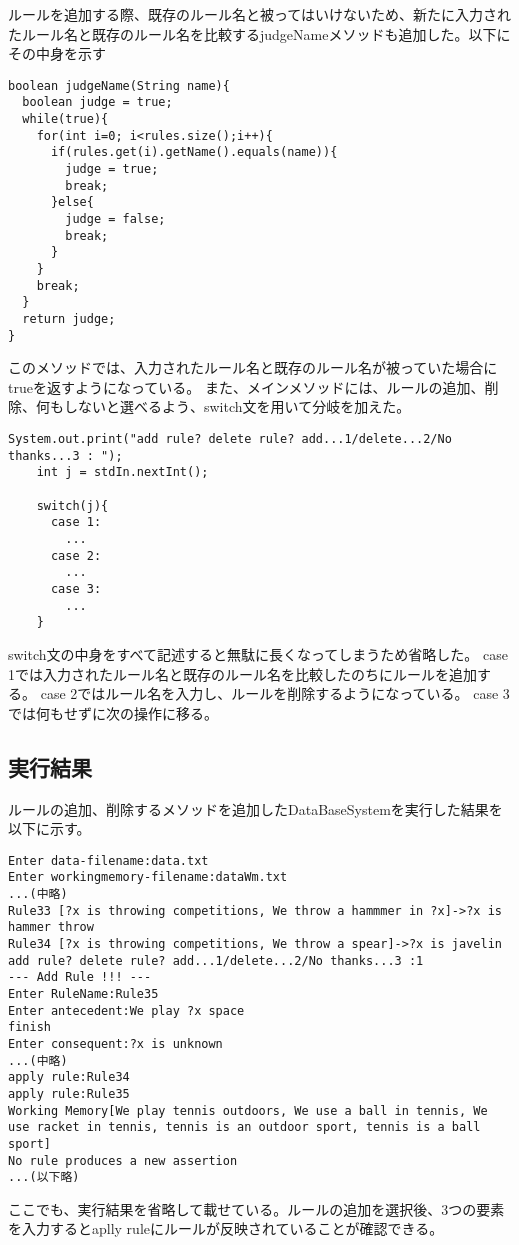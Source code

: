 \documentclass[a4j]{jarticle}
\begin{document}
ルールを追加する際、既存のルール名と被ってはいけないため、新たに入力されたルール名と既存のルール名を比較するjudgeNameメソッドも追加した。以下にその中身を示す
\begin{lstlisting}[caption=judgenameメソッド]
boolean judgeName(String name){
  boolean judge = true;
  while(true){
    for(int i=0; i<rules.size();i++){
      if(rules.get(i).getName().equals(name)){
        judge = true;
        break;
      }else{
        judge = false;
        break;
      }
    }
    break;
  }
  return judge;
}
\end{lstlisting}
このメソッドでは、入力されたルール名と既存のルール名が被っていた場合にtrueを返すようになっている。
また、メインメソッドには、ルールの追加、削除、何もしないと選べるよう、switch文を用いて分岐を加えた。
\begin{lstlisting}[caption=メインメソッドに追加した文]
    System.out.print("add rule? delete rule? add...1/delete...2/No thanks...3 : ");
    int j = stdIn.nextInt();

    switch(j){
      case 1:
		...
      case 2:
      	...
      case 3:
      	...
    }
\end{lstlisting}
switch文の中身をすべて記述すると無駄に長くなってしまうため省略した。
case 1では入力されたルール名と既存のルール名を比較したのちにルールを追加する。
case 2ではルール名を入力し、ルールを削除するようになっている。
case 3では何もせずに次の操作に移る。

\subsection{実行結果}
ルールの追加、削除するメソッドを追加したDataBaseSystemを実行した結果を以下に示す。
\begin{lstlisting}
Enter data-filename:data.txt
Enter workingmemory-filename:dataWm.txt
...(中略)
Rule33 [?x is throwing competitions, We throw a hammmer in ?x]->?x is hammer throw
Rule34 [?x is throwing competitions, We throw a spear]->?x is javelin
add rule? delete rule? add...1/delete...2/No thanks...3 :1
--- Add Rule !!! ---
Enter RuleName:Rule35
Enter antecedent:We play ?x space
finish
Enter consequent:?x is unknown
...(中略)
apply rule:Rule34
apply rule:Rule35
Working Memory[We play tennis outdoors, We use a ball in tennis, We use racket in tennis, tennis is an outdoor sport, tennis is a ball sport]
No rule produces a new assertion
...(以下略)
\end{lstlisting}
ここでも、実行結果を省略して載せている。ルールの追加を選択後、3つの要素を入力するとaplly ruleにルールが反映されていることが確認できる。
\end{document}
